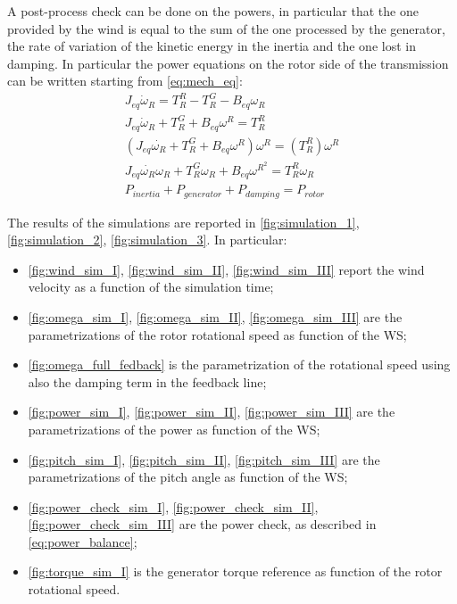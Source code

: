 A post-process check can be done on the powers, in particular that the one provided by the wind is equal to the sum of the one processed by the generator, the rate of variation of the kinetic energy in the inertia and the one lost in damping. In particular the power equations on the rotor side of the transmission can be written starting from \autoref{eq:mech_eq}:
\begin{gather}
    J_{eq}\dot{\omega}_{R} = T_R^R - T_R^G-B_{eq}\omega_R\\
    J_{eq}\dot{\omega}_{R} + T_R^G + B_{eq}\omega^R = T_R^R\\
    \left(J_{eq}\dot{\omega_{R}} + T_R^G + B_{eq}\omega^R\right)\omega^R = \left(T_R^R\right)\omega^R\\
    J_{eq}\dot{\omega_{R}}\omega_{R} + T_R^{G}\omega_{R} + B_{eq}\omega^{R^{2}} = T_R^{R}\omega_{R}\\
    P_{inertia} + P_{generator} + P_{damping} = P_{rotor} 
    \label{eq:power_balance}
\end{gather}

The results of the simulations are reported in \autoref{fig:simulation_1}, \ref{fig:simulation_2}, \ref{fig:simulation_3}. In particular:
\begin{itemize}
  \item \autoref{fig:wind_sim_I}, \ref{fig:wind_sim_II}, \ref{fig:wind_sim_III} report the wind velocity as a function of the simulation time;
  \item \autoref{fig:omega_sim_I}, \ref{fig:omega_sim_II}, \ref{fig:omega_sim_III} are the parametrizations of the rotor rotational speed as function of the WS;
  \item \autoref{fig:omega_full_fedback} is the parametrization of the rotational speed using also the damping term in the feedback line; 
  \item \autoref{fig:power_sim_I}, \ref{fig:power_sim_II}, \ref{fig:power_sim_III} are the parametrizations of the power as function of the WS;
  \item \autoref{fig:pitch_sim_I}, \ref{fig:pitch_sim_II}, \ref{fig:pitch_sim_III} are the parametrizations of the pitch angle as function of the WS;
  \item \autoref{fig:power_check_sim_I}, \ref{fig:power_check_sim_II}, \ref{fig:power_check_sim_III} are the power check, as described in \autoref{eq:power_balance};
  \item \autoref{fig:torque_sim_I} is the generator torque reference as function of the rotor rotational speed.
\end{itemize}

